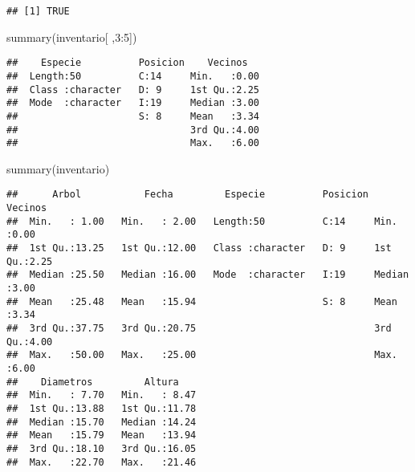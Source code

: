 \documentclass[
]{article}
\newenvironment{Shaded}{\begin{snugshade}}{\end{snugshade}}
\newcommand{\CommentTok}[1]{\textcolor[rgb]{0.56,0.35,0.01}{\textit{#1}}}
\newcommand{\DecValTok}[1]{\textcolor[rgb]{0.00,0.00,0.81}{#1}}
\newcommand{\FunctionTok}[1]{\textcolor[rgb]{0.00,0.00,0.00}{#1}}
\newcommand{\NormalTok}[1]{#1}
\newcommand{\OtherTok}[1]{\textcolor[rgb]{0.56,0.35,0.01}{#1}}
\newcommand{\SpecialCharTok}[1]{\textcolor[rgb]{0.00,0.00,0.00}{#1}}
\begin{document}
\begin{verbatim}
## [1] TRUE
\end{verbatim}

\begin{Shaded}
\begin{Highlighting}[]
\FunctionTok{summary}\NormalTok{(inventario[ ,}\DecValTok{3}\SpecialCharTok{:}\DecValTok{5}\NormalTok{])}
\end{Highlighting}
\end{Shaded}

\begin{verbatim}
##    Especie          Posicion    Vecinos    
##  Length:50          C:14     Min.   :0.00  
##  Class :character   D: 9     1st Qu.:2.25  
##  Mode  :character   I:19     Median :3.00  
##                     S: 8     Mean   :3.34  
##                              3rd Qu.:4.00  
##                              Max.   :6.00
\end{verbatim}

\begin{Shaded}
\begin{Highlighting}[]
\FunctionTok{summary}\NormalTok{(inventario)}
\end{Highlighting}
\end{Shaded}

\begin{verbatim}
##      Arbol           Fecha         Especie          Posicion    Vecinos    
##  Min.   : 1.00   Min.   : 2.00   Length:50          C:14     Min.   :0.00  
##  1st Qu.:13.25   1st Qu.:12.00   Class :character   D: 9     1st Qu.:2.25  
##  Median :25.50   Median :16.00   Mode  :character   I:19     Median :3.00  
##  Mean   :25.48   Mean   :15.94                      S: 8     Mean   :3.34  
##  3rd Qu.:37.75   3rd Qu.:20.75                               3rd Qu.:4.00  
##  Max.   :50.00   Max.   :25.00                               Max.   :6.00  
##    Diametros         Altura     
##  Min.   : 7.70   Min.   : 8.47  
##  1st Qu.:13.88   1st Qu.:11.78  
##  Median :15.70   Median :14.24  
##  Mean   :15.79   Mean   :13.94  
##  3rd Qu.:18.10   3rd Qu.:16.05  
##  Max.   :22.70   Max.   :21.46
\end{verbatim}

\begin{Shaded}
\end{Shaded}
\end{document}
